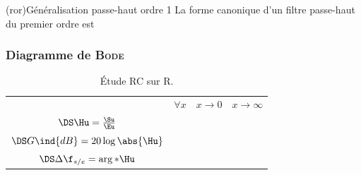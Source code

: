 \documentclass[../../main/main.tex]{subfiles}
\begin{document}
\begin{tcb*}(ror){Généralisation passe-haut ordre 1}
	La forme canonique d'un filtre passe-haut du premier ordre est
	\psw{%
		\[
			\boxed{\Hu(x) = H_0\frac{\jx}{1+\jx}}
			\qav
			H_0 = \cte
			\qet
			x = \frac{\w}{\w_c}
			\qet
			\w_c = \frac{1}{RC}
		\]
	}%
	\vspace{-15pt}
\end{tcb*}

\subsubsection{Diagramme de \textsc{Bode}}
\begin{table}[htbp!]
	\centering
	\caption{Étude RC sur R.}
	\begin{tabularx}{\linewidth}{cYYY}
		\toprule
		 &
		$\forall x$
		 &
		$x\to 0$
		 &
		$x\to\infty$
		\\
		\addlinespace[0.5em]
		\cmidrule(lr){2-4}
		$\DS\Hu = \frac{\Su}{\Eu}$
		 &
		 &
		 &
		\\
		\addlinespace[0.5em]
		$\DS G\ind{dB} = 20 \log \abs{\Hu}$
		 &
		 &
		 &
		\\
		\addlinespace[0.5em]
		$\DS\Delta\f_{s/e} = \arg*{\Hu}$
		 &
		 &
		 &
		\\
		\bottomrule
	\end{tabularx}
	\label{tab:rcr}
\end{table}
\end{document}
